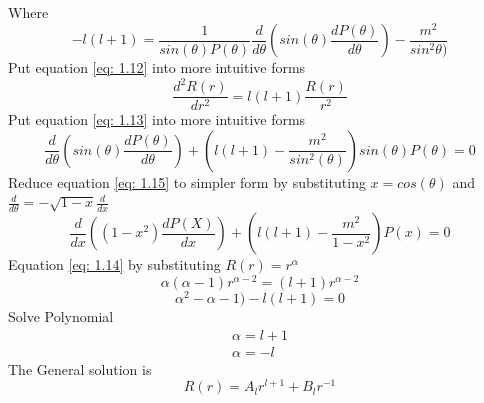 \documentclass[12pt]{article}
\begin{document}
    Where 
    \begin{equation} \label{eq: 1.13}
        -l(l+1) = \frac{1}{sin(\theta) P(\theta)} \frac{d}{d\theta}\left(sin(\theta) \frac{dP(\theta)}{d\theta}\right) - \frac{m^2}{sin^2\theta)}
    \end{equation}
    Put equation \ref{eq: 1.12} into more intuitive forms
    \begin{equation} \label{eq: 1.14}
        \frac{d^2 R(r)}{dr^2} = l(l+1) \frac{R(r)}{r^2} 
    \end{equation}
    Put equation \ref{eq: 1.13} into more intuitive forms
    \begin{equation} \label{eq: 1.15}
        \frac{d}{d\theta} \left(sin(\theta) \frac{d P(\theta)}{d\theta}\right) + \left(l(l+1)-\frac{m^2}{sin^2(\theta)}\right) sin(\theta) P(\theta) = 0
    \end{equation}
    Reduce equation \ref{eq: 1.15} to simpler form by substituting $x=cos(\theta)$ and $\frac{d}{d\theta} = -\sqrt{1-x} \frac{d}{dx}$
    \begin{equation} \label{eq: 1.16}
        \frac{d}{dx} \left((1-x^2) \frac{d P(X)}{dx}\right) + \left(l(l+1)-\frac{m^2}{1-x^2}\right) P(x) = 0
    \end{equation}
    Equation \ref{eq: 1.14} by substituting $R(r) = r^{\alpha}$
    \begin{equation} \label{eq: 1.17}
        \alpha (\alpha - 1) r^{\alpha - 2} = (l+1) r^{\alpha - 2}
    \end{equation}    
    \begin{equation} \label{eq: 1.18}
        \alpha^2 - \alpha - 1) - l(l+1) = 0
    \end{equation}        
    Solve Polynomial
    \begin{equation} \label{eq: 1.19}
        \begin{split}
            \alpha = l + 1
            \\ \alpha = -l
        \end{split}        
    \end{equation}
    The General solution is 
    \begin{equation} \label{eq: 1.20}
        R(r) = A_l r^{l+1} + B_l r^{-1}
    \end{equation} 
\end{document}
